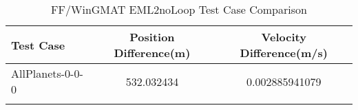 \begin{table}[htbp!]
\centering
\caption{ FF/WinGMAT EML2noLoop Test Case Comparison}
      \begin{tabular}{lcc}
      \hline\hline
          Test Case & Position Difference(m) & Velocity Difference(m/s) \\
         \hline
         AllPlanets-0-0-0 & 532.032434 & 0.002885941079 \\
      \hline\hline
      \label{Table: EML2noLoop FF-WinGMAT Table} 
\end{tabular}
\end{table}
